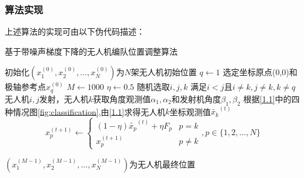 \documentclass[withoutpreface,bwprint]{cumcmthesis} %
\begin{document}
\subsubsection{算法实现}\label{Algo1}
上述算法的实现可由以下伪代码描述：
\begin{algorithm}[H]
	\caption{基于带噪声梯度下降的无人机编队位置调整算法} 
	\begin{algorithmic}[1]
    \State 初始化$(x_1^{(0)},x_2^{(0)}, \dots, x_N^{(0)})$为$N$架无人机初始位置 
    \State $q\gets 1$ 
    \State 选定坐标原点(0,0)和极轴参考点$x_q^{(0)}$
    \State $M\gets 1000$ 
    \State $\eta \gets 0.5$ 
        \State 随机选取$i, j, k$ 满足$i < j$且$i \ne k, j \ne k, k \ne q$
        \State 无人机$i,j$发射，无人机$k$获取角度观测值$\alpha_1,\alpha_2$和发射机角度$\beta_1,\beta_2$
        \State 根据\ref{1.1}中的四种情况图\ref{fig:classification},由\ref{1.1}求得无人机$k$坐标观测值$\tilde{x_k}^{(t)}$
        \State  
                    $$x_p^{(t+1)} \gets \begin{cases}
                        (1-\eta) \tilde{x_p}^{(t)} + \eta F_p & p=k \\
                        x_p^{(t+1)} & p\ne k
                    \end{cases}, p\in \{1,2,\dots, N\}
                    $$ 
                
    \EndFor
    \State $(x_1^{(M-1)},x_2^{(M-1)}, \dots, x_N^{(M-1)})$为无人机最终位置
	\end{algorithmic} 
	
\end{algorithm}
\end{document}
